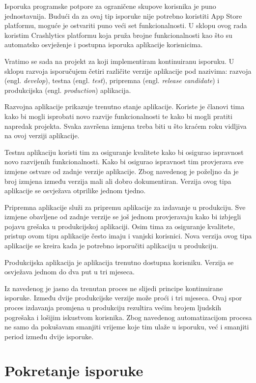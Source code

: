 \documentclass[times, utf8, diplomski, numeric]{fer}
\newcommand{\eng}[1]{(engl. \textit{#1})}
\begin{document}
Isporuka programske potpore za ograničene skupove korisnika je puno jednostavnija. Budući da za ovaj tip isporuke nije potrebno koristiti App Store platformu, moguće je ostvariti puno veći set funkcionalnosti. U sklopu ovog rada koristim Crashlytics platformu koja pruža brojne funkcionalnosti kao što su automatsko osvježenje i postupna isporuka aplikacije korisnicima.

Vratimo se sada na projekt za koji implementiram kontinuiranu isporuku. U sklopu razvoja isporučujem četiri različite verzije aplikacije pod nazivima: razvoja \eng{develop}, testna \eng{test}, pripremna \eng{release candidate} i produkcijska \eng{production} aplikacija.

Razvojna aplikacije prikazuje trenutno stanje aplikacije. Koriste je članovi tima kako bi mogli isprobati novo razvije funkcionalnosti te kako bi mogli pratiti napredak projekta. Svaka završena izmjena treba biti u što kraćem roku vidljiva na ovoj verziji aplikacije.

Testnu aplikaciju koristi tim za osiguranje kvalitete kako bi osigurao ispravnost novo razvijenih funkcionalnosti. Kako bi osigurao ispravnost tim provjerava sve izmjene ostvare od zadnje verzije aplikacije. Zbog navedenog je poželjno da je broj izmjena između verzija mali ali dobro dokumentiran. Verzija ovog tipa aplikacije se osvježava otprilike jednom tjedno.

Pripremna aplikacije služi za pripremu aplikacije za izdavanje u produkciju. Sve izmjene obavljene od zadnje verzije se još jednom provjeravaju kako bi izbjegli pojavu grešaka u produkcijskoj aplikaciji. Osim tima za osiguranje kvalitete, pristup ovom tipu aplikacije često imaju i vanjski korisnici. Nova verzija ovog tipa aplikacije se kreira kada je potrebno isporučiti aplikaciju u produkciju.

Produkcijska aplikacija je aplikacija trenutno dostupna korisniku. Verzija se osvježava jednom do dva put u tri mjeseca.

Iz navedenog je jasno da trenutan proces ne slijedi principe kontinuirane isporuke. Između dvije produkcijske verzije može proći i tri mjeseca. Ovaj spor proces izdavanja promjena u produkciju rezultira većim brojem ljudskih pogrešaka i lošijim iskustvom korisnika. Zbog navedenog automatizacijom procesa ne samo da pokušavam smanjiti vrijeme koje tim ulaže u isporuku, već i smanjiti period između dvije isporuke.


\section{Pokretanje isporuke}
\end{document}
